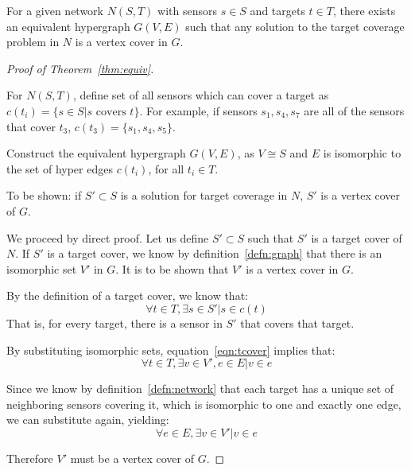 \begin{thm}
  For a given network $N(S,T)$ with sensors $s\in S$ and targets $t\in T$, there exists an equivalent hypergraph $G(V,E)$ such that any solution to the target coverage problem in $N$ is a vertex cover in $G$.
\label{thm:equiv}
\end{thm}
\begin{proof}[Proof of Theorem~\ref{thm:equiv}]
\label{prf:equiv}
\begin{defn}
For $N(S,T)$, define set of all sensors which can cover a target as $c(t_i) = \{s \in S | s \text{\ covers\ } t\}$.  For example, if sensors $s_1, s_4, s_7$ are all of the sensors that cover $t_3$, $c(t_3) = \{s_1, s_4, s_5\}$. \label{defn:network}
\end{defn}
\begin{defn}Construct the equivalent hypergraph $G(V,E)$, as $V \cong S$ and $E$ is isomorphic to the set of hyper edges $c(t_i)$, for all $t_i \in T$. 
\label{defn:graph}
\end{defn}

To be shown: if $S' \subset S$ is a solution for target coverage in $N$, $S'$ is a vertex cover of $G$. 

We proceed by direct proof. Let us define $S'\subset S$ such that $S'$ is a target cover of $N$. If $S'$ is a target cover, we know by definition~\ref{defn:graph} that there is an isomorphic set $V'$ in $G$. It is to be shown that $V'$ is a vertex cover in $G$.

By the definition of a target cover, we know that:
\begin{equation}
\forall t \in T, \exists s \in S' | s \in c(t)
\label{eqn:tcover}
\end{equation}
That is, for every target, there is a sensor in $S'$ that covers that target.

By substituting isomorphic sets, equation~\ref{eqn:tcover} implies that:
\begin{equation}
\forall t \in T, \exists v \in V', e \in E | v \in e
\label{eqn:tvbridge}
\end{equation}

Since we know by definition~\ref{defn:network} that each target has a unique set of neighboring sensors covering it, which is isomorphic to one and exactly one edge, we can substitute again, yielding:
\begin{equation}
\forall e \in E, \exists v\in V' | v \in e
\end{equation}

Therefore $V'$ must be a vertex cover of $G$.  
\end{proof}
